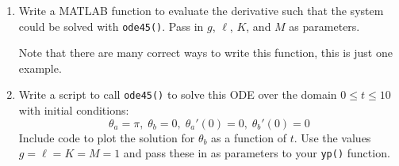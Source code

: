 \documentclass[letterpaper, fontsize=12pt]{scrartcl} %
\numberwithin{equation}{section} %
\numberwithin{figure}{section} %
\numberwithin{table}{section} %
\begin{document}
\begin{enumerate}
\begin{enumerate}
\begin{enumerate}[label=(\roman*)]


\item Write a MATLAB function to evaluate the derivative such that the system could be solved with \texttt{ode45()}. Pass in $g$, $\ell$, $K$, and $M$ as parameters.
%
%

Note that there are many correct ways to write this function, this is just one example. 

\item Write a script to call \texttt{ode45()} to solve this ODE over the domain $0 \leq t \leq 10$ with initial conditions:
\[ \theta_a = \pi, \; \theta_b = 0, \; \theta_a'(0) = 0, \; \theta_b'(0) = 0 \]
Include code to plot the solution for $\theta_b$ as a function of $t$. Use the values $g = \ell = K = M = 1$ and pass these in as parameters to your \texttt{yp()} function. 
%


\end{enumerate}
\end{enumerate}
\end{enumerate}
\end{document}
